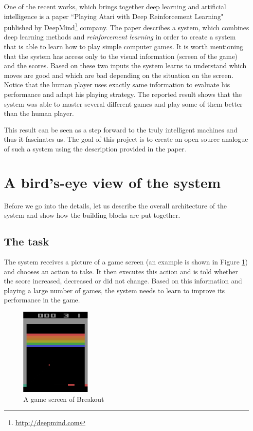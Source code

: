 \documentclass[a4paper,12pt]{article}
\begin{document}
One of the recent works, which brings together deep learning and artificial intelligence is a paper ``Playing Atari with Deep Reinforcement Learning"\cite{mnih2013playing} published by DeepMind\footnote{\url{http://deepmind.com}} company. The paper describes a system, which combines deep learning methods and \emph{reinforcement learning} in order to create a system that is able to learn how to play simple computer games. It is worth mentioning that the system has access only to the visual information (screen of the game) and the scores. Based on these two inputs the system learns to understand which moves are good and which are bad depending on the situation on the screen. Notice that the human player uses exactly same information to evaluate his performance and adapt his playing strategy. The reported result shows that the system was able to master several different games and play some of them better than the human player.

This result can be seen as a step forward to the truly intelligent machines and thus it fascinates us. The goal of this project is to create an open-source analogue of such a system using the description provided in the paper.



%
%
\pagebreak
\section{A bird's-eye view of the system}
Before we go into the details, let us describe the overall architecture of the system and show how the building blocks are put together. 

\subsection{The task}

The system receives a picture of a game screen (an example is shown in Figure \ref{fig:breakoutscreen}) and chooses an action to take. It then executes this action and is told whether the score increased, decreased or did not change. Based on this information and playing a large number of games, the system needs to learn to improve its performance in the game.

\begin{figure}[h]
\centering
\includegraphics[width=3.5cm]{fig_gamescreen}
\caption{A game screen of Breakout}
\label{fig:breakoutscreen}
\end{figure}
\end{document}
